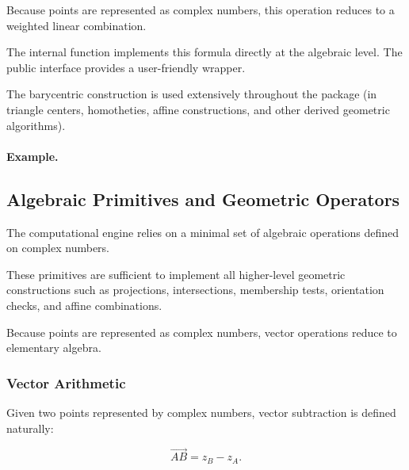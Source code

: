 Because points are represented as complex numbers,
this operation reduces to a weighted linear combination.

\medskip
The internal function  implements this formula
directly at the algebraic level. The public interface
 provides a user-friendly wrapper.

\medskip
The barycentric construction is used extensively throughout
the package (in triangle centers, homotheties, affine constructions,
and other derived geometric algorithms).

\paragraph{Example.}


\begin{tkzexample}[latex=.35\textwidth]
\begin{center}
\end{center}
\end{tkzexample}


\subsection{Algebraic Primitives and Geometric Operators}

The computational engine relies on a minimal set of algebraic
operations defined on complex numbers.

These primitives are sufficient to implement all higher-level
geometric constructions such as projections, intersections,
membership tests, orientation checks, and affine combinations.

Because points are represented as complex numbers,
vector operations reduce to elementary algebra.

\subsubsection{Vector Arithmetic}

Given two points represented by complex numbers,
vector subtraction is defined naturally:

\[
\overrightarrow{AB} = z_B - z_A.
\]

